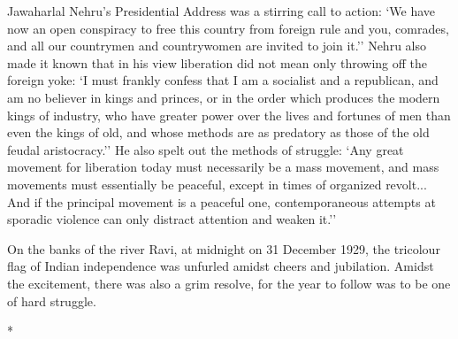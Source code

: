 Jawaharlal Nehru's Presidential Address was a stirring call to action: `We have now an open conspiracy to free this country from foreign rule and you, comrades, and all our countrymen and countrywomen are invited to join it.'' Nehru also made it known that in his view liberation did not mean only throwing off the foreign yoke: `I must frankly confess that I am a socialist and a republican, and am no believer in kings and princes, or in the order which produces the modern kings of industry, who have greater power over the lives and fortunes of men than even the kings of old, and whose methods are as predatory as those of the old feudal aristocracy.'' He also spelt out the methods of struggle: `Any great movement for liberation today must necessarily be a mass movement, and mass movements must essentially be peaceful, except in times of organized revolt... And if the principal movement is a peaceful one, contemporaneous attempts at sporadic violence can only distract attention and weaken it.'' 

On the banks of the river Ravi, at midnight on 31 December 1929, the tricolour flag of Indian independence was unfurled amidst cheers and jubilation. Amidst the excitement, there was also a grim resolve, for the year to follow was to be one of hard struggle.

\begin{center}*\end{center}

\paragraph*{}


